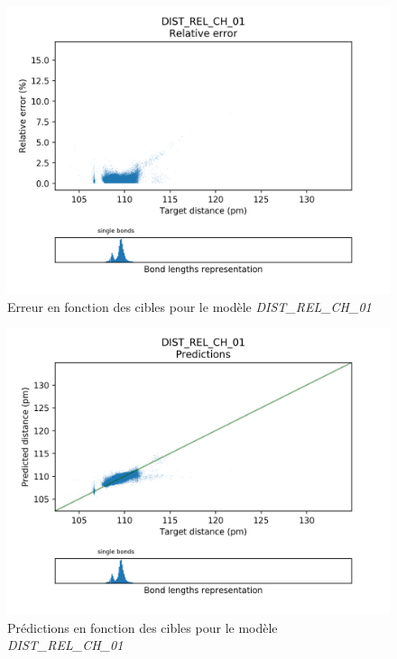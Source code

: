 \begin{figure}
	\centering
	
	\includegraphics[scale=0.7]{../figures/DIST_REL_CH_01/DIST_REL_CH_01_distrib_rmse_dist.png}	
	
	\caption{Erreur en fonction des cibles pour le modèle \emph{DIST\_REL\_CH\_01}}
	\label{fdistrib_err_rel_dist_rel_ch_01}
	\end{figure}
	
\begin{figure}
	\centering
	
	\includegraphics[scale=0.7]{../figures/DIST_REL_CH_01/DIST_REL_CH_01_preds_targets.png}	
	
	\caption{Prédictions en fonction des cibles pour le modèle \emph{DIST\_REL\_CH\_01}}
	\label{fpreds_targets_dist_rel_ch_01}

\end{figure}

